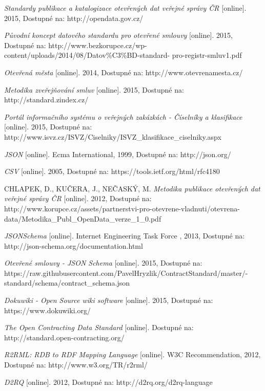 \begin{thebibliography}{99}
  \emph{Standardy publikace a katalogizace otevřených dat veřejné správy ČR} 
  [online]. 2015, Dostupné na: 
  http://opendata.gov.cz/  
  
  \emph{Původní koncept datového standardu pro otevřené smlouvy} 
  [online]. 2015, Dostupné na: 
  http://www.bezkorupce.cz/wp-content/uploads/2014/08/Datov\%C3\%BD-standard- pro-registr-smluv1.pdf  
  
  \emph{Otevřená města} 
  [online]. 2014, Dostupné na: 
  http://www.otevrenamesta.cz/    
  
  \emph{Metodika zveřejňování smluv} 
  [online]. 2015, Dostupné na: 
  http://standard.zindex.cz/

  \emph{Portál informačního systému o veřejných zakázkách - Číselníky a klasifikace} 
  [online]. 2015, Dostupné na: 
  http://www.isvz.cz/ISVZ/Ciselniky/ISVZ\_klasifikace\_ciselniky.aspx  
  
  \emph{JSON} 
  [online]. Ecma International, 1999, Dostupné na: 
  http://json.org/

  \emph{CSV} 
  [online]. 2005, Dostupné na: 
  https://tools.ietf.org/html/rfc4180
  
  CHLAPEK, D., KUČERA, J., NEČASKÝ, M.
  \emph{Metodika publikace otevřených dat veřejné správy ČR } 
  [online]. 2012, Dostupné na: 
  http://www.korupce.cz/assets/partnerstvi-pro-otevrene-vladnuti/otevrena-data/Metodika\_Publ\_OpenData\_verze\_1\_0.pdf
  
  \emph{JSONSchema} 
  [online]. Internet Engineering Task Force , 2013, Dostupné na: 
  http://json-schema.org/documentation.html 
  
  \emph{Otevřené smlouvy - JSON Schema} 
  [online]. 2015, Dostupné na: 
  https://raw.githubusercontent.com/PavelHryzlik/ContractStandard/master/- standard/schema/contract\_schema.json
  
  \emph{Dokuwiki - Open Source wiki software} 
  [online]. 2015, Dostupné na: 
  https://www.dokuwiki.org/
  
  \emph{The Open Contracting Data Standard} 
  [online]. Dostupné na: 
  http://standard.open-contracting.org/ 

  \emph{R2RML: RDB to RDF Mapping Language} 
  [online]. W3C Recommendation, 2012, Dostupné na: 
  http://www.w3.org/TR/r2rml/
  
  \emph{D2RQ} 
  [online]. 2012, Dostupné na: 
  http://d2rq.org/d2rq-language  


\end{thebibliography}
